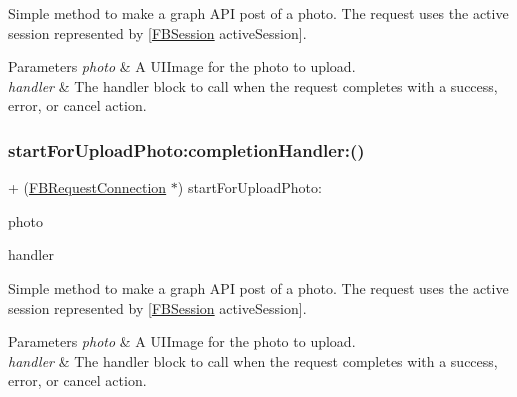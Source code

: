 Simple method to make a graph A\+PI post of a photo. The request uses the active session represented by {\ttfamily \mbox{[}\hyperlink{interfaceFBSession}{F\+B\+Session} active\+Session\mbox{]}}.


\begin{DoxyParams}{Parameters}
{\em photo} & A {\ttfamily U\+I\+Image} for the photo to upload. \\
\hline
{\em handler} & The handler block to call when the request completes with a success, error, or cancel action. \\
\hline
\end{DoxyParams}
\mbox{\label{interfaceFBRequestConnection_a824e16e083537312be6d59c8bece3f0e}} 
\subsubsection{\texorpdfstring{start\+For\+Upload\+Photo\+:completion\+Handler\+:()}{startForUploadPhoto:completionHandler:()}\hspace{0.1cm}{\footnotesize\ttfamily [3/5]}}
{\footnotesize\ttfamily + (\hyperlink{interfaceFBRequestConnection}{F\+B\+Request\+Connection} $\ast$) start\+For\+Upload\+Photo\+: \begin{DoxyParamCaption}\item[{(U\+I\+Image $\ast$)}]{photo }\item[{completionHandler:(F\+B\+Request\+Handler)}]{handler }\end{DoxyParamCaption}}

Simple method to make a graph A\+PI post of a photo. The request uses the active session represented by {\ttfamily \mbox{[}\hyperlink{interfaceFBSession}{F\+B\+Session} active\+Session\mbox{]}}.


\begin{DoxyParams}{Parameters}
{\em photo} & A {\ttfamily U\+I\+Image} for the photo to upload. \\
\hline
{\em handler} & The handler block to call when the request completes with a success, error, or cancel action. \\
\hline
\end{DoxyParams}
\mbox{\label{interfaceFBRequestConnection_a824e16e083537312be6d59c8bece3f0e}} 
